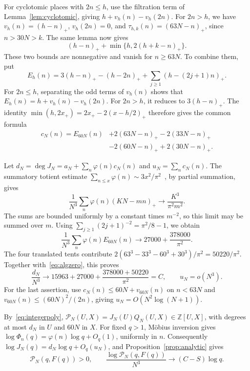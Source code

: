 \documentclass[12pt]{article}
\theoremstyle{remark}
\newcommand{\Z}{\mathbb Z}
\begin{document}
For cyclotomic places with $2n\leq h$, use the filtration term of
Lemma~\ref{lem:cyclotomic}, giving $h+v_h(n)-v_h(2n)$.
For $2n>h$, we have $v_h(n)=(h-n)_+$, $v_h(2n)=0$, and
$\tau_{h,k}(n)=(63N-n)_+$, since $n>30N>k$.
The same lemma now gives
\[
(h-n)_++\min\{h,2(h+k-n)_+\}.
\]
These two bounds are nonnegative and vanish for $n\geq63N$.
To combine them, put
\[
E_h(n)=3(h-n)_+-(h-2n)_++\sum_{j\geq1}(h-(2j+1)n)_+.
\]
For $2n\leq h$, separating the odd terms of $v_h(n)$ shows that
$E_h(n)=h+v_h(n)-v_h(2n)$. For $2n>h$, it reduces to $3(h-n)_+$.
The identity $\min(h,2x_+)=2x_+-2(x-h/2)_+$ therefore gives the common formula
\begin{equation}\label{eq:alge}
\begin{split}
c_N(n)=E_{60N}(n)&+2(63N-n)_+-2(33N-n)_+\\
&-2(60N-n)_++2(30N-n)_+.
\end{split}
\end{equation}

Let $d_N=\deg J_N=a_N+\sum_n\varphi(n)c_N(n)$ and $u_N=\sum_n c_N(n)$.
The summatory totient estimate
$\sum_{n\leq x}\varphi(n)\sim3x^2/\pi^2$~\cite[27.11.6]{dlmf}, by partial summation, gives
\[
\frac1{N^3}\sum_n\varphi(n)(KN-mn)_+
\longrightarrow\frac{K^3}{\pi^2m^2}.
\]
The sums are bounded uniformly by a constant times $m^{-2}$, so this limit
may be summed over $m$. Using
$\sum_{j\geq1}(2j+1)^{-2}=\pi^2/8-1$, we obtain
\[
\frac1{N^3}\sum_n\varphi(n)E_{60N}(n)
\longrightarrow27000+\frac{378000}{\pi^2}.
\]
The four translated tents contribute
$2(63^3-33^3-60^3+30^3)/\pi^2=50220/\pi^2$.
Together with~\eqref{eq:algzero}, this proves
\begin{equation}\label{eq:alglimits}
\frac{d_N}{N^3}\longrightarrow15963+27000+\frac{378000+50220}{\pi^2}=C,
\qquad u_N=o(N^3).
\end{equation}
For the last assertion, use $c_N(n)\leq60N+v_{60N}(n)$ on $n<63N$ and
$v_{60N}(n)\leq(60N)^2/(2n)$, giving $u_N=O(N^2\log(N+1))$.

By~\eqref{eq:integerpoly},
$\mathcal P_N(U,X)=J_N(U)Q_N(U,X)\in\Z[U,X]$, with degrees at most $d_N$ in
$U$ and $60N$ in $X$. For fixed $q>1$, M\"obius inversion gives
$\log\Phi_n(q)=\varphi(n)\log q+O_q(1)$, uniformly in $n$.
Consequently $\log J_N(q)=d_N\log q+O_q(u_N)$, and Proposition~\ref{prop:analytic}
gives
\begin{equation}\label{eq:algsmall}
\mathcal P_N(q,F(q))>0,\qquad
\frac{\log\mathcal P_N(q,F(q))}{N^3}\longrightarrow(C-S)\log q.
\end{equation}
\end{document}
